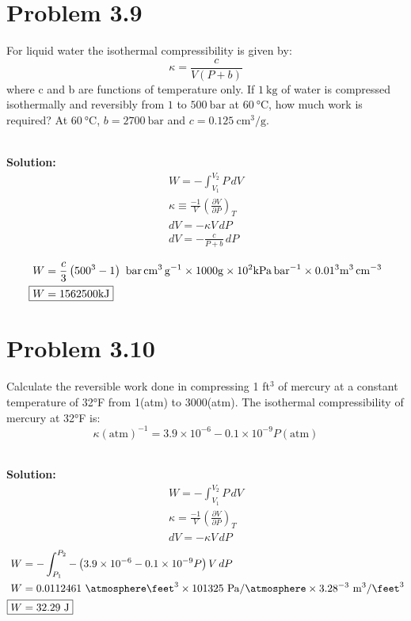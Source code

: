 \documentclass{article}
\newenvironment{solution}{\par\noindent\textbf{\\Solution:\\}}{\par\medskip}
\begin{document}
\section*{Problem 3.9}
For liquid water the isothermal compressibility is given by:
$$ \kappa = \frac{c}{V(P+b)} $$
where c and b are functions of temperature only. If $1~\unit{ \kilo\gram }$ of water is compressed isothermally and reversibly from $1$ to $500~\unit{ \bar }$ at $60~\unit{ \degreeCelsius }$, how much work is required? At $60~\unit{ \degreeCelsius }$, $b=2700~\unit{ \bar }$ and $c=0.125~\unit{ \centi\meter\cubed\per\gram }$.

\begin{solution}
    \begin{gather*}
        W = -\int_{V_{1}}^{V_{2}} P \, dV \\
        \kappa \equiv \frac{-1}{V}\left( \frac{\partial V}{\partial P} \right)_{T} \\
        dV = -\kappa V \, dP \\
        dV = -\frac{c}{P+b}\,dP \\
    \end{gather*}
    \vspace{-3em}
    \begin{align*}
        W & = \frac{c}{3}\left( 500^{3}-1 \right)~\unit{ \bar\centi\meter\cubed\per\gram }\times 1000\unit{ \gram } \times 10^{2}\unit{ \kilo\pascal\per\bar }\times 0.01^{3}\unit{ \meter\cubed\per\centi\meter\cubed } \\
        \Aboxed{ W & = 1562500\unit{ \kilo\joule } }
    \end{align*}
\end{solution}

\section*{Problem 3.10}
Calculate the reversible work done in compressing 1 ft$^3$ of mercury at a constant temperature of 32°F from 1(atm) to 3000(atm). The isothermal compressibility of mercury at 32°F is:
$$ \kappa(\text{atm})^{-1} = 3.9 \times 10^{-6} - 0.1 \times 10^{-9} P(\text{atm}) $$

\begin{solution}
    \begin{gather*}
        W = -\int_{V_{1}}^{V_{2}} P \, dV \\
        \kappa = \frac{-1}{V}\left( \frac{\partial V}{\partial P} \right)_{T} \\
        dV = -\kappa V\,dP
    \end{gather*}
    \begin{align*}
        W &= -\int_{P_{1}}^{P_{2}} -\left( 3.9\times10^{-6}-0.1\times10^{-9}P \right)V \, dP \\
        W &= 0.0112461~\unit{ \atmosphere\feet\cubed } \times 101325~\unit{ \pascal\per\atmosphere }\times 3.28^{-3}~\unit{ \meter\cubed\per\feet\cubed } \\
        \Aboxed{ W &= 32.29~\unit{ \joule } }
    \end{align*}
\end{solution}
\end{document}
